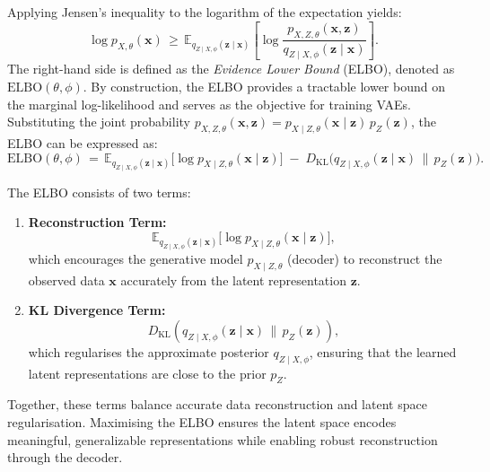 Applying Jensen's inequality to the logarithm of the expectation yields:
\[
\log p_{X,\theta}(\mathbf{x}) 
\,\geq\,
\mathbb{E}_{q_{Z \mid X,\phi}(\mathbf{z} \mid \mathbf{x})} 
\left[
\log \frac{p_{X,Z,\theta}(\mathbf{x}, \mathbf{z})}{q_{Z \mid X,\phi}(\mathbf{z} \mid \mathbf{x})}
\right].
\]
The right-hand side is defined as the \emph{Evidence Lower Bound} (ELBO), denoted as \(\mathrm{ELBO}(\theta, \phi)\). By construction, the ELBO provides a tractable lower bound on the marginal log-likelihood and serves as the objective for training VAEs. Substituting the joint probability \(p_{X,Z,\theta}(\mathbf{x}, \mathbf{z}) = p_{X \mid Z,\theta}(\mathbf{x} \mid \mathbf{z}) \, p_Z(\mathbf{z})\), the ELBO can be expressed as:
\[
\mathrm{ELBO}(\theta, \phi) 
\,=\,
\mathbb{E}_{q_{Z \mid X,\phi}(\mathbf{z} \mid \mathbf{x})}
\big[
\log p_{X \mid Z,\theta}(\mathbf{x} \mid \mathbf{z})
\big]
\;-\;
D_{\mathrm{KL}}
\big(q_{Z \mid X,\phi}(\mathbf{z} \mid \mathbf{x}) \,\|\, p_Z(\mathbf{z})\big).
\]

\noindent The ELBO consists of two terms:
\begin{enumerate}
    \item \textbf{Reconstruction Term:}  
    \[
    \mathbb{E}_{q_{Z \mid X,\phi}(\mathbf{z} \mid \mathbf{x})} 
    \big[\log p_{X \mid Z,\theta}(\mathbf{x} \mid \mathbf{z})\big],
    \]
    which encourages the generative model \(p_{X \mid Z,\theta}\) (decoder) to reconstruct the observed data \(\mathbf{x}\) accurately from the latent representation \(\mathbf{z}\).
    \item \textbf{KL Divergence Term:}  
    \[
    D_{\mathrm{KL}}(q_{Z \mid X,\phi}(\mathbf{z} \mid \mathbf{x}) \,\|\, p_Z(\mathbf{z})),
    \]
    which regularises the approximate posterior \(q_{Z \mid X,\phi}\), ensuring that the learned latent representations are close to the prior \(p_Z\).
\end{enumerate}

Together, these terms balance accurate data reconstruction and latent space regularisation. Maximising the ELBO ensures the latent space encodes meaningful, generalizable representations while enabling robust reconstruction through the decoder.


